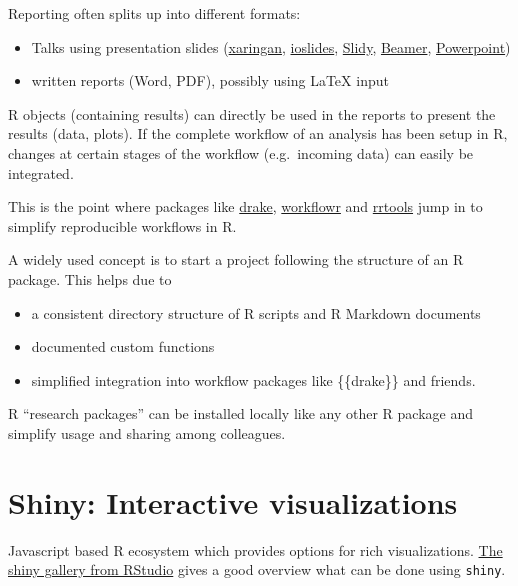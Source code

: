 \documentclass[]{book}
\providecommand{\tightlist}{%
  \setlength{\itemsep}{0pt}\setlength{\parskip}{0pt}}
\begin{document}
Reporting often splits up into different formats:

\begin{itemize}
\tightlist
\item
  Talks using presentation slides (\href{https://bookdown.org/yihui/rmarkdown/xaringan.html}{xaringan}, \href{https://bookdown.org/yihui/rmarkdown/ioslides-presentation.html}{ioslides}, \href{https://bookdown.org/yihui/rmarkdown/slidy-presentation.html}{Slidy}, \href{https://bookdown.org/yihui/rmarkdown/beamer-presentation.html}{Beamer}, \href{https://bookdown.org/yihui/rmarkdown/powerpoint-presentation.html}{Powerpoint})
\item
  written reports (Word, PDF), possibly using LaTeX input
\end{itemize}

R objects (containing results) can directly be used in the reports to present the results (data, plots).
If the complete workflow of an analysis has been setup in R, changes at certain stages of the workflow (e.g.~incoming data) can easily be integrated.

This is the point where packages like \href{https://docs.ropensci.org/drake/}{drake}, \href{https://jdblischak.github.io/workflowr/}{workflowr} and \href{https://github.com/benmarwick/rrtools}{rrtools} jump in to simplify reproducible workflows in R.

A widely used concept is to start a project following the structure of an R package.
This helps due to

\begin{itemize}
\tightlist
\item
  a consistent directory structure of R scripts and R Markdown documents
\item
  documented custom functions
\item
  simplified integration into workflow packages like \{\{drake\}\} and friends.
\end{itemize}

R ``research packages'' can be installed locally like any other R package and simplify usage and sharing among colleagues.

\hypertarget{shiny-interactive-visualizations}{%
\section{Shiny: Interactive visualizations}\label{shiny-interactive-visualizations}}

Javascript based R ecosystem which provides options for rich visualizations.
\href{https://shiny.rstudio.com/gallery/}{The shiny gallery from RStudio} gives a good overview what can be done using \texttt{shiny}.
\end{document}

